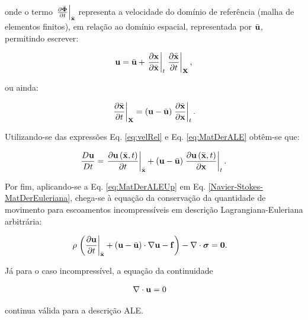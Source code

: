 \documentclass[tese_patricia]{subfiles}%
\begin{document}
\noindent onde o termo $\left. \frac{\partial \bar{\mathbf{\Phi}}}{\partial t} \right|_{\bar{\mathbf{x}}}$ representa a velocidade do domínio de referência (malha de elementos finitos), em relação ao domínio espacial, representada por $\bar{\mathbf{u}}$, permitindo escrever: 

\begin{align}
	\mathbf{u} = \bar{\mathbf{u}} + \left . \frac{\partial \mathbf{x}}{\partial \bar{\mathbf{x}}} \right|_{t} \left . \frac{\partial \bar{\mathbf{x}}}{\partial t} \right|_{\mathbf{X}},
\end{align}

\noindent ou ainda:

\begin{align}
	\left . \frac{\partial \bar{\mathbf{x}}}{\partial t} \right|_{\mathbf{X}} = \left( \mathbf{u} - \bar{\mathbf{u}} \right) \left. \frac{\partial \bar{\mathbf{x}}}{\partial \mathbf{x}} \right |_{t}. \label{eq:velRel}
\end{align}

Utilizando-se das expressões Eq. \eqref{eq:velRel} e Eq. \eqref{eq:MatDerALE} obtêm-se que: 

\begin{align}
	\frac{D\mathbf{u}}{Dt} = \left. \frac{\partial\mathbf{u}\left(\bar{\mathbf{x}},t\right)}{\partial t} \right|_{\bar{\mathbf{x}}} +  \left( \mathbf{u} - \bar{\mathbf{u}} \right) \left. \frac{\partial\mathbf{u}\left(\bar{\mathbf{x}},t\right)}{\partial \mathbf{x}} \right|_{t}. \label{eq:MatDerALEUp}
\end{align}

Por fim, aplicando-se a Eq. \eqref{eq:MatDerALEUp} em Eq. \ref{Navier-Stokes-MatDerEuleriana}, chega-se à equação da conservação da quantidade de movimento para escoamentos incompressíveis em descrição Lagrangiana-Euleriana arbitrária:

\begin{align}
	\rho \left . \left(\frac{\partial\mathbf{u}}{\partial t} \right|_{\bar{\mathbf{x}}} + \left(\mathbf{u} - \bar{\mathbf{u}}\right)\cdot\nabla\mathbf{u} - \mathbf{f} \right) - \nabla \cdot \boldsymbol{\sigma} &= \mathbf{0}.  \label{eq:Navier-Stokes-ALE} 
\end{align}

Já para o caso incompressível, a equação da continuidade 

\begin{align}
	\nabla \cdot \mathbf{u} &= 0 \label{eq:Continuity}
\end{align}

\noindent continua válida para a descrição ALE.
\end{document}
